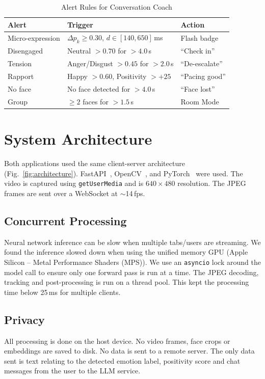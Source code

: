 \documentclass[conference]{IEEEtran}
\begin{document}
\begin{table}[!t]
\centering
\caption{Alert Rules for Conversation Coach}
\label{tab:alerts}
\small
\begin{tabular}{@{}lll@{}}
\toprule
Alert & Trigger & Action \\
\midrule
Micro-expression & $\Delta p_k \ge 0.30$, $d \in [140, 650]$\,ms & Flash badge \\
Disengaged & Neutral $>0.70$ for $>4.0$\,s & ``Check in'' \\
Tension & Anger/Disgust $>0.45$ for $>2.0$\,s & ``De-escalate'' \\
Rapport & Happy $>0.60$, Positivity $> +25$ & ``Pacing good'' \\
No face & No face detected for $>4.0$\,s & ``Face lost'' \\
Group & $\ge 2$ faces for $>1.5$\,s & Room Mode \\
\bottomrule
\end{tabular}
\end{table}

\section{System Architecture}
Both applications used the same client-server architecture (Fig.~\ref{fig:architecture}). FastAPI~\cite{fastapi}, OpenCV~\cite{opencv}, and PyTorch~\cite{pytorch} were used. The video is captured using \texttt{getUserMedia} and is $640\times480$ resolution. The JPEG frames are sent over a WebSocket at $\sim$14\,fps.

\subsection{Concurrent Processing}
Neural network inference can be slow when multiple tabs/users are streaming. We found the inference slowed down when using the unified memory GPU (Apple Silicon -- Metal Performance Shaders (MPS)). We use an \texttt{asyncio} lock around the model call to ensure only one forward pass is run at a time. The JPEG decoding, tracking and post-processing is run on a thread pool. This kept the processing time below 25\,ms for multiple clients.

\subsection{Privacy}
All processing is done on the host device. No video frames, face crops or embeddings are saved to disk. No data is sent to a remote server. The only data sent is text relating to the detected emotion label, positivity score and chat messages from the user to the LLM service.
\end{document}
